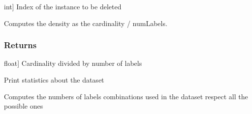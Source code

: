 \documentclass[letterpaper,10pt,english]{sphinxmanual}
\begin{document}
\begin{fulllineitems}
\begin{fulllineitems}
\begin{description}
\sphinxlineitem{index\_instance}{[}int{]}
\sphinxAtStartPar
Index of the instance to be deleted

\end{description}

\end{fulllineitems}


\begin{fulllineitems}
\label{\detokenize{data/_autosummary/miml.data.miml_dataset.MIMLDataset:miml.data.miml_dataset.MIMLDataset.density}}
\pysigstartsignatures
{}
\pysigstopsignatures
\sphinxAtStartPar
Computes the density as the cardinality / numLabels.


\subsubsection{Returns}
\label{\detokenize{data/_autosummary/miml.data.miml_dataset.MIMLDataset:id6}}\begin{description}
\sphinxlineitem{density}{[}float{]}
\sphinxAtStartPar
Cardinality divided by number of labels

\end{description}

\end{fulllineitems}


\begin{fulllineitems}
\label{\detokenize{data/_autosummary/miml.data.miml_dataset.MIMLDataset:miml.data.miml_dataset.MIMLDataset.describe}}
\pysigstartsignatures
{}
\pysigstopsignatures
\sphinxAtStartPar
Print statistics about the dataset

\end{fulllineitems}


\begin{fulllineitems}
\label{\detokenize{data/_autosummary/miml.data.miml_dataset.MIMLDataset:miml.data.miml_dataset.MIMLDataset.distinct}}
\pysigstartsignatures
{}
\pysigstopsignatures
\sphinxAtStartPar
Computes the numbers of labels combinations used in the dataset respect all the possible ones



\end{fulllineitems}
\end{fulllineitems}
\end{document}
